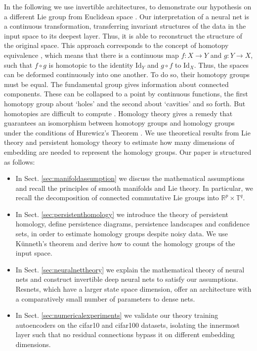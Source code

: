 \documentclass[envcountsect,runningheads]{llncs}
\begin{document}
In the following we use invertible architectures, to demonstrate our hypothesis on a different Lie group from Euclidean space . Our interpretation of a neural net is a continuous transformation, transferring invariant structures of the data in the input space to its deepest layer. Thus, it is able to reconstruct the structure of the original space. This approach corresponds to the concept of homotopy equivalence , which means that there is a continuous map $f: X \rightarrow Y$ and $g: Y \rightarrow X$, such that $f \circ g$ is homotopic to the identity $\text{Id}_Y$ and $g \circ f$ to $\text{Id}_X$. Thus, the spaces can be deformed continuously into one another. To do so, their homotopy groups must be equal. The fundamental group gives information about connected components. These can be collapsed to a point by continuous functions, the first homotopy group about `holes' and the second about `cavities' and so forth. But homotopies are difficult to compute . Homology theory gives a remedy that guarantees an isomorphism between homotopy groups and homology groups under the conditions of Hurewicz's Theorem . We use theoretical results from Lie theory and persistent homology theory to estimate how many dimensions of embedding are needed to represent the homology groups. Our paper is structured as follows:
\begin{itemize}
    \item In Sect. \ref{sec:manifoldassumption} we discuss the mathematical assumptions and recall the principles of smooth manifolds and Lie theory. In particular, we recall the decomposition of connected commutative Lie groups into $\mathbb{R}^p \times \mathbb{T}^q$.
    \item In Sect. \ref{sec:persistenthomology} we introduce the theory of persistent homology, define persistence diagrams, persistence landscapes and confidence sets, in order to estimate homology groups despite noisy data. We use Künneth's theorem and derive how to count the homology groups of the input space.
    \item In Sect. \ref{sec:neuralnettheory} we explain the mathematical theory of neural nets and construct invertible deep neural nets to satisfy our assumptions. Resnets, which have a larger state space dimension, offer an architecture with a comparatively small number of parameters to dense nets.
    \item In Sect. \ref{sec:numericalexperiments} we validate our theory training autoencoders on the cifar10 and cifar100 datasets, isolating the innermost layer such that no residual connections bypass it on different embedding dimensions.
\end{itemize}
\end{document}
